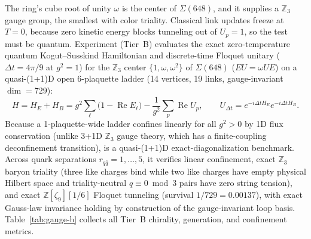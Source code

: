 The ring's cube root of unity $\omega$ is the center of $\Sigma(648)$, and it supplies a $\mathbb{Z}_3$ gauge group,
the smallest with color triality. Classical link updates freeze at $T = 0$, because zero kinetic energy blocks
tunneling out of $U_p = 1$, so the test must be quantum. Experiment  (Tier~B) evaluates the exact zero-temperature quantum Kogut--Susskind
Hamiltonian \cite{kogut1975} and discrete-time Floquet unitary ($\Delta t = 4\pi/9$ at $g^2 = 1$) for the $\mathbb{Z}_3$
center $\{1, \omega, \omega^2\}$ of $\Sigma(648)$ ($EU = \omega UE$) on a quasi-(1+1)D open 6-plaquette ladder (14
vertices, 19 links, gauge-invariant $\dim = 729$):
\begin{equation}
H = H_E + H_B = g^2 \sum_{\ell} \bigl(1 - \operatorname{Re} E_\ell\bigr) - \frac{1}{g^2} \sum_p \operatorname{Re} U_p,
\qquad
U_{\Delta t} = e^{-i\Delta t H_E} e^{-i\Delta t H_B}.
\label{eq:ks-z3}
\end{equation}
Because a 1-plaquette-wide ladder confines linearly for all $g^2 > 0$ by 1D flux conservation (unlike 3+1D $\mathbb{Z}_3$
gauge theory, which has a finite-coupling deconfinement transition),  is a quasi-(1+1)D
exact-diagonalization benchmark. Across quark separations $r_{q\bar{q}} = 1, \dots, 5$, it verifies linear confinement,
exact $\mathbb{Z}_3$ baryon triality (three like charges bind while two like charges have empty physical Hilbert space
and triality-neutral $q \equiv 0 \bmod 3$ pairs have zero string tension), and exact $\mathbb{Z}[\zeta_9][1/6]$ Floquet
tunneling (survival $1/729 = 0.00137$), with exact Gauss-law invariance holding by construction of the gauge-invariant
loop basis. Table~\ref{tab:gauge-b} collects all Tier~B chirality, generation, and confinement metrics.

